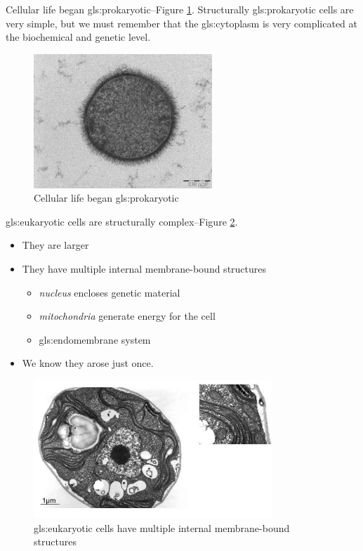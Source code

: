 \documentclass[]{article}
\begin{document}
Cellular life began \gls{gls:prokaryotic}--Figure \ref{fig:prokaryote}. Structurally \gls{gls:prokaryotic} cells are very simple, but we must remember that the \gls{gls:cytoplasm} is very complicated at the biochemical and genetic level.

\begin{figure}[H]
	\begin{center}
		\caption{Cellular life began \gls{gls:prokaryotic}}\label{fig:prokaryote}
		\includegraphics[width=0.6\textwidth]{prokaryote}
	\end{center}
\end{figure}

\Gls{gls:eukaryotic} cells are structurally complex--Figure \ref{fig:ManyMembranes}. 

\begin{itemize}
	\item They are larger
	\item They have multiple internal membrane-bound structures
	\begin{itemize}
		\item \emph{nucleus} encloses genetic material
		\item \emph{mitochondria} generate energy for the cell
		\item \gls{gls:endomembrane} system
	\end{itemize}
	\item We know they arose just once.
\end{itemize}

\begin{figure}[H]
	\caption[\Gls{gls:eukaryotic} cells: multiple internal membrane-bound structures]{\Gls{gls:eukaryotic} cells have multiple internal membrane-bound structures}\label{fig:ManyMembranes}
	\includegraphics[width=0.8\textwidth]{ManyMembranes}
\end{figure}
\end{document}
